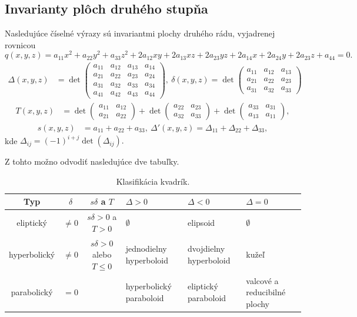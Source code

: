 \subsection{Invarianty plôch druhého stupňa}
Nasledujúce číselné výrazy sú invariantmi plochy druhého rádu, vyjadrenej rovnicou 
\[ q(x, y, z) = a_{11}x^2 + a_{22}y^2 + a_{33}z^2 + 2a_{12}xy + 2a_{13}xz + 2a_{23}yz + 2a_{14}x + 2a_{24}y + 2a_{23}z + a_{44} = 0. \]
\begin{align*}
\Delta(x, y, z) &= \det \begin{pmatrix} 
a_{11} & a_{12} & a_{13} & a_{14} \\ 
a_{21} & a_{22} & a_{23} & a_{24} \\
a_{31} & a_{32} & a_{33} & a_{34} \\
a_{41} & a_{42} & a_{43} & a_{44}
\end{pmatrix}, \
\delta(x, y, z) = \det \begin{pmatrix} 
a_{11} & a_{12} & a_{13} \\ 
a_{21} & a_{22} & a_{23} \\ 
a_{31} & a_{32} & a_{33} 
\end{pmatrix}
\end{align*}
\begin{align*}
T(x, y, z) &= \det \begin{pmatrix} 
a_{11} & a_{12} \\ 
a_{21} & a_{22} 
\end{pmatrix} + \det \begin{pmatrix} 
a_{22} & a_{23} \\ 
a_{32} & a_{33} 
\end{pmatrix} + \det \begin{pmatrix} 
a_{33} & a_{31} \\ 
a_{13} & a_{11} 
\end{pmatrix}, 
\end{align*}
\begin{align*}
s(x, y, z) &= a_{11} + a_{22} + a_{33}, \ \Delta'(x, y, z) = \Delta_{11} + \Delta_{22} + \Delta_{33}, 
\end{align*}
kde $
\Delta_{ij} = (-1)^{i+j} \det(\Delta_{ij}).$

Z tohto možno odvodiť nasledujúce dve tabuľky.

\begin{table}[h]
\centering
\begin{tabular}{|c|c|c|p{2.2cm}|p{2.15cm}|p{2cm}|}
\hline
Typ & $\delta$ & $s\delta$ a $T$ & $\Delta > 0$ & $\Delta < 0$ & $\Delta = 0$ \\
\hline
eliptický & $\neq 0$ & $s\delta>0$ a $T>0$ & $\emptyset$ & elipsoid & $\emptyset$ \\
\hline
hyperbolický & $\neq 0$ & $s\delta>0$ alebo $T \leq0$ & jednodielny hyperboloid & dvojdielny hyperboloid & kužeľ \\
\hline
parabolický & $=0$ & & hyperbolický paraboloid & eliptický paraboloid & valcové a reducibilné plochy \\
\hline
\end{tabular}
\caption{Klasifikácia kvadrík.}
\label{tab:classification_of_quadrics}
\end{table}


